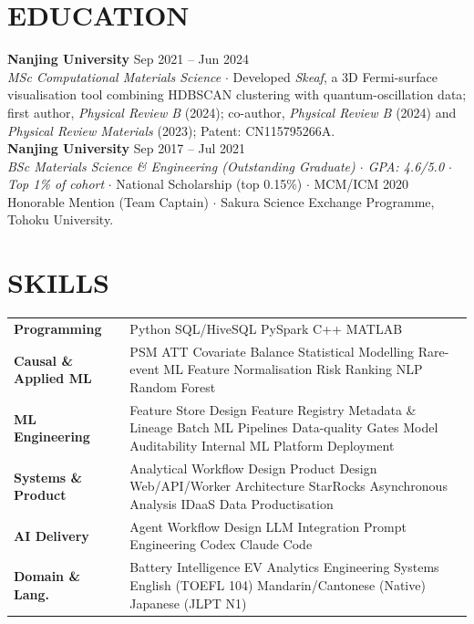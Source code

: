\documentclass[a4paper,10pt]{article}
\begin{document}
\section{EDUCATION}
\noindent\textbf{Nanjing University} \hfill Sep 2021 -- Jun 2024\\
\textit{MSc Computational Materials Science} \;$\cdot$\; Developed \textit{Skeaf}, a 3D Fermi-surface visualisation tool combining HDBSCAN clustering with quantum-oscillation data; first author, \textit{Physical Review B} (2024); co-author, \textit{Physical Review B} (2024) and \textit{Physical Review Materials} (2023); Patent: CN115795266A.\\[1pt]
\noindent\textbf{Nanjing University} \hfill Sep 2017 -- Jul 2021\\
\textit{BSc Materials Science \& Engineering (Outstanding Graduate) \;$\cdot$\; GPA: 4.6/5.0 \;$\cdot$\; Top 1\% of cohort} \;$\cdot$\; National Scholarship (top 0.15\%) \;$\cdot$\; MCM/ICM 2020 Honorable Mention (Team Captain) \;$\cdot$\; Sakura Science Exchange Programme, Tohoku University.
\section{SKILLS}
\begin{tabular}{@{}p{3.0cm}p{12.5cm}@{}}
\textbf{Programming} & Python \textperiodcentered{} SQL/HiveSQL \textperiodcentered{} PySpark \textperiodcentered{} C++ \textperiodcentered{} MATLAB \\[1pt]
\textbf{Causal \& Applied ML} & PSM \textperiodcentered{} ATT \textperiodcentered{} Covariate Balance \textperiodcentered{} Statistical Modelling \textperiodcentered{} Rare-event ML \textperiodcentered{} Feature Normalisation \textperiodcentered{} Risk Ranking \textperiodcentered{} NLP \textperiodcentered{} Random Forest \\[1pt]
\textbf{ML Engineering} & Feature Store Design \textperiodcentered{} Feature Registry \textperiodcentered{} Metadata \& Lineage \textperiodcentered{} Batch ML Pipelines \textperiodcentered{} Data-quality Gates \textperiodcentered{} Model Auditability \textperiodcentered{} Internal ML Platform Deployment \\[1pt]
\textbf{Systems \& Product} & Analytical Workflow Design \textperiodcentered{} Product Design \textperiodcentered{} Web/API/Worker Architecture \textperiodcentered{} StarRocks \textperiodcentered{} Asynchronous Analysis \textperiodcentered{} IDaaS \textperiodcentered{} Data Productisation \\[1pt]
\textbf{AI Delivery} & Agent Workflow Design \textperiodcentered{} LLM Integration \textperiodcentered{} Prompt Engineering \textperiodcentered{} Codex \textperiodcentered{} Claude Code \\[1pt]
\textbf{Domain \& Lang.} & Battery Intelligence \textperiodcentered{} EV Analytics \textperiodcentered{} Engineering Systems \textperiodcentered{} English (TOEFL 104) \textperiodcentered{} Mandarin/Cantonese (Native) \textperiodcentered{} Japanese (JLPT N1) \\
\end{tabular}
\end{document}
